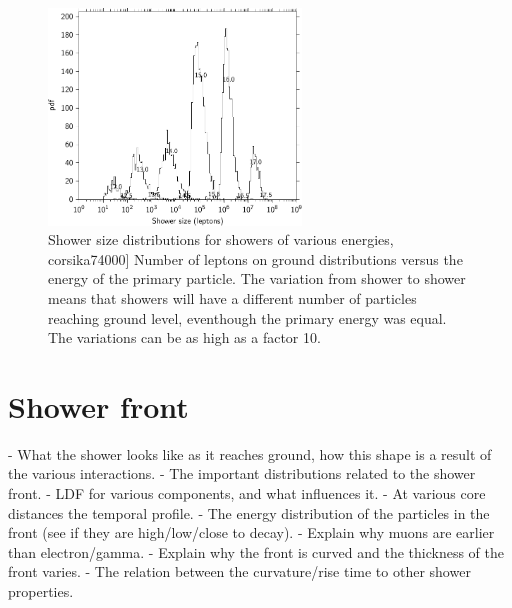\begin{figure}
    \centering
    \includegraphics[width=0.6\textwidth]
                    {plots/cosmic-rays/shower_size_distribution}
    \caption{Shower size distributions for showers of various energies, corsika74000]
Number of leptons on ground distributions versus the energy of the primary particle. The variation from shower to shower means that showers will have a different number of particles reaching ground level, eventhough the primary energy was equal. The variations can be as high as a factor 10.}
    \label{fig:shower_size_distribution}
\end{figure}


\section{Shower front}

- What the shower looks like as it reaches ground, how this shape is a result of the various interactions.
- The important distributions related to the shower front.
- LDF for various components, and what influences it.
- At various core distances the temporal profile.
- The energy distribution of the particles in the front (see if they are high/low/close to decay).
- Explain why muons are earlier than electron/gamma.
- Explain why the front is curved and the thickness of the front varies.
- The relation between the curvature/rise time to other shower properties.

